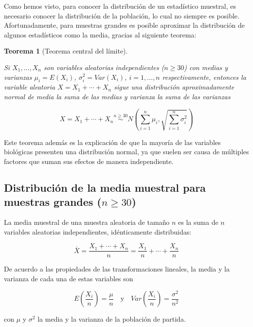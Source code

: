 \documentclass[
  a4paper,
]{scrreport}
\theoremstyle{plain}
\newtheorem{theorem}{Teorema}[chapter]
\theoremstyle{definition}
\theoremstyle{definition}
\theoremstyle{remark}
\begin{document}
Como hemos visto, para conocer la distribución de un estadístico
muestral, es necesario conocer la distribución de la población, lo cual
no siempre es posible. Afortunadamente, para muestras grandes es posible
aproximar la distribución de algunos estadísticos como la media, gracias
al siguiente teorema:

\begin{theorem}[Teorema central del
límite]\protect\hypertarget{thm-teorema-central-limite}{}\label{thm-teorema-central-limite}

Si \(X_1,\ldots, X_n\) son variables aleatorias independientes
(\(n\geq 30\)) con medias y varianzas \(\mu_i=E(X_i)\),
\(\sigma^2_i=Var(X_i)\), \(i=1,\ldots,n\) respectivamente, entonces la
variable aleatoria \(X=X_1+\cdots+X_n\) sigue una distribución
aproximadamente normal de media la suma de las medias y varianza la suma
de las varianzas

\[
X=X_1+\cdots+X_n\stackrel{n\geq 30} \sim N\left(\sum_{i=1}^n \mu_i, \sqrt{\sum_{i=1}^n \sigma^2_i}\right)
\]

\end{theorem}

Este teorema además es la explicación de que la mayoría de las variables
biológicas presenten una distribución normal, ya que suelen ser causa de
múltiples factores que suman sus efectos de manera independiente.

\subsection{\texorpdfstring{Distribución de la media muestral para
muestras grandes
(\(n\geq 30\))}{Distribución de la media muestral para muestras grandes (n\textbackslash geq 30)}}\label{distribuciuxf3n-de-la-media-muestral-para-muestras-grandes-ngeq-30}

La media muestral de una muestra aleatoria de tamaño \(n\) es la suma de
\(n\) variables aleatorias independientes, idénticamente distribuidas:

\[
\bar X = \frac{X_1+\cdots+X_n}{n} = \frac{X_1}{n}+\cdots+\frac{X_n}{n}
\]

De acuerdo a las propiedades de las transformaciones lineales, la media
y la varianza de cada una de estas variables son

\[
E\left(\frac{X_i}{n}\right) =\frac{\mu}{n} \quad  \mbox{y} \quad Var\left(\frac{X_i}{n}\right) = \frac{\sigma^2}{n^2}
\]

con \(\mu\) y \(\sigma^2\) la media y la varianza de la población de
partida.
\end{document}
